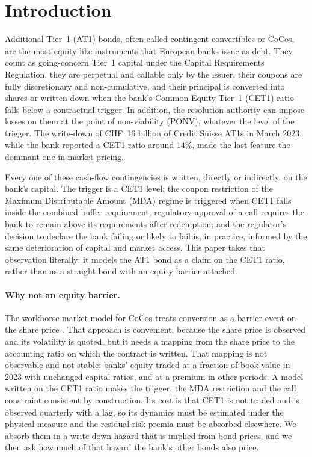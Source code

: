 \section{Introduction}\label{sec:intro}

Additional Tier~1 (AT1) bonds, often called contingent convertibles or CoCos, are the
most equity-like instruments that European banks issue as debt. They count as
going-concern Tier~1 capital under the Capital Requirements Regulation, they are
perpetual and callable only by the issuer, their coupons are fully discretionary and
non-cumulative, and their principal is converted into shares or written down when the
bank's Common Equity Tier~1 (CET1) ratio falls below a contractual trigger. In
addition, the resolution authority can impose losses on them at the point of
non-viability (PONV), whatever the level of the trigger. The write-down of
CHF~16 billion of Credit Suisse AT1s in March 2023, while the bank reported a CET1
ratio around $14\%$, made the last feature the dominant one in market pricing.

Every one of these cash-flow contingencies is written, directly or indirectly, on the
bank's capital. The trigger is a CET1 level; the coupon restriction of the Maximum
Distributable Amount (MDA) regime is triggered when CET1 falls inside the combined
buffer requirement; regulatory approval of a call requires the bank to remain above its
requirements after redemption; and the regulator's decision to declare the bank
failing or likely to fail is, in practice, informed by the same deterioration of
capital and market access. This paper takes that observation literally: it models the
AT1 bond as a claim on the CET1 ratio, rather than as a straight bond with an equity
barrier attached.

\paragraph{Why not an equity barrier.}
The workhorse market model for CoCos treats conversion as a barrier event on the share
price \citep{DeSpiegeleerSchoutens2012}. That approach is convenient, because the share
price is observed and its volatility is quoted, but it needs a mapping from the share
price to the accounting ratio on which the contract is written. That mapping is not
observable and not stable: banks' equity traded at a fraction of book value in 2023
with unchanged capital ratios, and at a premium in other periods. A model written on
the CET1 ratio makes the trigger, the MDA restriction and the call constraint
consistent by construction. Its cost is that CET1 is not traded and is observed
quarterly with a lag, so its dynamics must be estimated under the physical measure and
the residual risk premia must be absorbed elsewhere. We absorb them in a write-down
hazard that is implied from bond prices, and we then ask how much of that hazard the
bank's other bonds also price.

